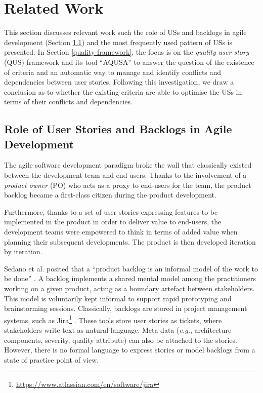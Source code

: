 \section{Related Work}\label{related-work}
This section discusses relevant work such the role of USs and backlogs in agile development (Section \ref{us}) and the most frequently used pattern of USs is presented. In Section \ref{quality-framework}, the focus is on the \emph{quality user story} (QUS) framework and its tool \enquote{AQUSA} to answer the question of the existence of criteria and an automatic way to manage and identify conflicts and dependencies between user stories. Following this investigation, we draw a conclusion as to whether the existing criteria are able to optimise the USs in terms of their conflicts and dependencies.

\subsection{Role of User Stories and Backlogs in Agile Development}\label{us}
The agile software development paradigm broke the wall that classically existed between the development team and end-users. Thanks to the involvement of a \emph{product owner} (PO) who acts as a proxy to end-users for the team, the product backlog \cite{sedano2019product} became a first-class citizen during the product development. 

Furthermore, thanks to a set of user stories expressing features to be implemented in the product in order to deliver value to end-users, the development teams were empowered to think in terms of added value when planning their subsequent developments. The product is then developed iteration by iteration. 

Sedano et al. posited that a \enquote{product backlog is an informal model of the work to be done} \cite{sedano2019product}. A backlog implements a shared mental model among the practitioners working on a given product, acting as a boundary artefact between stakeholders. This model is voluntarily kept informal to support rapid prototyping and brainstorming sessions. Classically, backlogs are stored in project management systems, such as Jira\footnote{\href{https://www.atlassian.com/en/software/jira}{https://www.atlassian.com/en/software/jira}} . These tools store user stories as tickets, where stakeholders write text as natural language. Meta-data (\emph{e.g.}, architecture components, severity, quality attribute) can also be attached to the stories. However, there is no formal language to express stories or model backlogs from a state of practice point of view.

